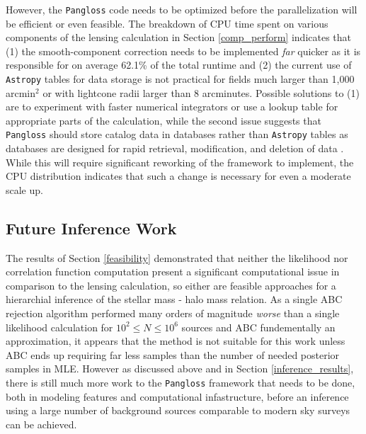 \documentclass[%
 reprint,
 amsmath,amssymb,
 aps,nofootinbib
]{revtex4-1}
\begin{document}
However, the \texttt{Pangloss} code needs to be optimized before the parallelization will be efficient or even feasible. The breakdown of CPU time spent on various components of the lensing calculation in Section \ref{comp_perform} indicates that (1) the smooth-component correction needs to be implemented \textit{far} quicker as it is responsible for on average 62.1\% of the total runtime and (2) the current use of \texttt{Astropy} tables for data storage is not practical for fields much larger than 1,000 arcmin$^2$ or with lightcone radii larger than 8 arcminutes. Possible solutions to (1) are to experiment with faster numerical integrators or use a lookup table for appropriate parts of the calculation, while the second issue suggests that \texttt{Pangloss} should store catalog data in databases rather than \texttt{Astropy} tables as databases are designed for rapid retrieval, modification, and deletion of data \cite{databases}. While this will require significant reworking of the framework to implement, the CPU distribution indicates that such a change is necessary for even a moderate scale up.

\subsection{Future Inference Work}

The results of Section \ref{feasibility} demonstrated that neither the likelihood nor correlation function computation present a significant computational issue in comparison to the lensing calculation, so either are feasible approaches for a hierarchial inference of the stellar mass - halo mass relation. As a single ABC rejection algorithm performed many orders of magnitude \textit{worse} than a single likelihood calculation for ${10^2\leq N\leq10^6}$ sources and ABC fundementally an approximation, it appears that the method is not suitable for this work unless ABC ends up requiring far less samples than the number of needed posterior samples in MLE. However as discussed above and in Section \ref{inference_results}, there is still much more work to the \texttt{Pangloss} framework that needs to be done, both in modeling features and computational infastructure, before an inference using a large number of background sources comparable to modern sky surveys can be achieved.


\end{document}
